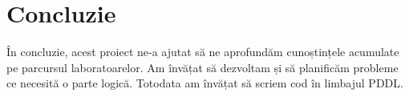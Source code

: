  \section{Concluzie}
 
În concluzie, acest proiect ne-a ajutat să ne aprofundăm cunoștințele acumulate pe parcursul laboratoarelor. Am  învățat să dezvoltam și să planificăm probleme ce necesită o parte logică. Totodata am învățat să scriem cod în limbajul PDDL.